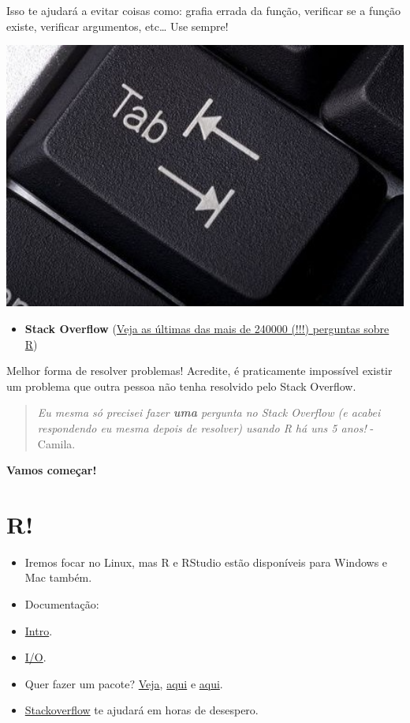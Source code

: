 \documentclass[]{book}
\providecommand{\tightlist}{%
  \setlength{\itemsep}{0pt}\setlength{\parskip}{0pt}}
\theoremstyle{definition}
\theoremstyle{definition}
\theoremstyle{definition}
\theoremstyle{remark}
\begin{document}
Isso te ajudará a evitar coisas como: grafia errada da função, verificar
se a função existe, verificar argumentos, etc\ldots{} Use sempre!

\includegraphics[width=5.88in]{figuras/tab-key-}

\begin{itemize}
\tightlist
\item
  \textbf{Stack Overflow}
  (\href{https://stackoverflow.com/questions/tagged/r}{Veja as últimas
  das mais de 240000 (!!!) perguntas sobre R})
\end{itemize}

Melhor forma de resolver problemas! Acredite, é praticamente impossível
existir um problema que outra pessoa não tenha resolvido pelo Stack
Overflow.

\begin{quote}
\emph{Eu mesma só precisei fazer \textbf{uma} pergunta no Stack Overflow
(e acabei respondendo eu mesma depois de resolver) usando R há uns 5
anos!} - Camila.
\end{quote}

\textbf{Vamos começar!}

\chapter{R!}\label{r}

\begin{itemize}
\tightlist
\item
  Iremos focar no Linux, mas R e RStudio estão disponíveis para Windows
  e Mac também.
\item
  Documentação:
\item
  \href{http://cran.r-project.org/doc/manuals/r-release/R-intro.html}{Intro}.
\item
  \href{http://cran.r-project.org/doc/manuals/r-release/R-data.html}{I/O}.
\item
  Quer fazer um pacote?
  \href{http://cran.r-project.org/doc/manuals/r-release/R-exts.html}{Veja},
  \href{http://cran.r-project.org/doc/manuals/r-release/R-ints.html}{aqui}
  e
  \href{http://cran.r-project.org/doc/manuals/r-release/R-lang.html}{aqui}.
\item
  \href{https://stackoverflow.com/questions/tagged/r}{Stackoverflow} te
  ajudará em horas de desespero.
\end{itemize}
\end{document}

